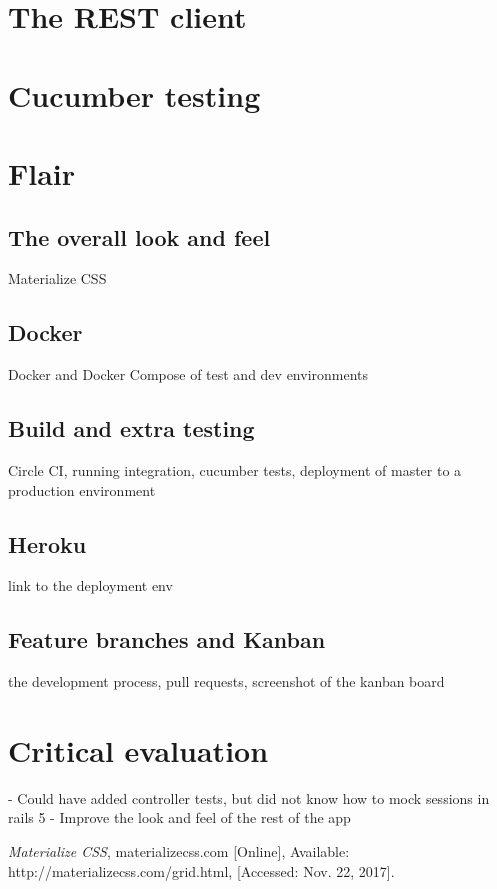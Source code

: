 \documentclass[a4paper, 11pt, titlepage]{article}
\begin{document}
\section{The REST client}

\section{Cucumber testing}

\section{Flair}
\subsection{The overall look and feel}
Materialize CSS

\subsection{Docker}
Docker and Docker Compose of test and dev environments

\subsection{Build and extra testing}
Circle CI, running integration, cucumber tests, deployment of master to a production environment

\subsection{Heroku}
link to the deployment env

\subsection{Feature branches and Kanban}
the development process, pull requests, screenshot of the kanban board

\section{Critical evaluation}
- Could have added controller tests, but did not know how to mock sessions in rails 5
- Improve the look and feel of the rest of the app

\begin{thebibliography}{1}

 \emph{Materialize CSS}, materializecss.com [Online],
Available: http://materializecss.com/grid.html, [Accessed: Nov. 22, 2017].

\end{thebibliography}
\end{document}
